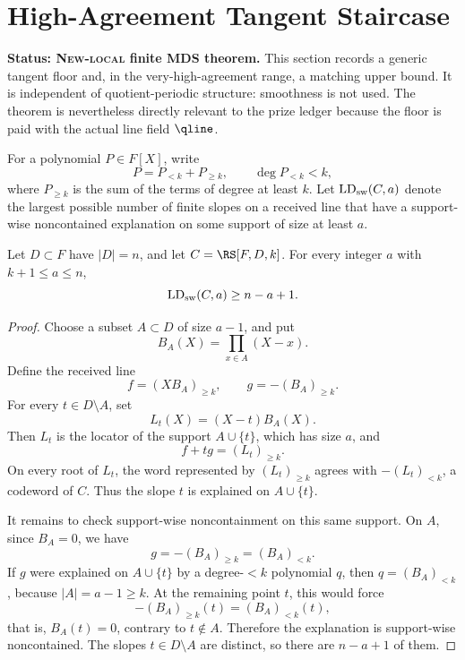 \section{High-Agreement Tangent Staircase}
\label{sec:tangent-staircase}

\textbf{Status: \textsc{New-local} finite MDS theorem.}
This section records a generic tangent floor and, in the very-high-agreement
range, a matching upper bound.  It is independent of quotient-periodic
structure: smoothness is not used.  The theorem is nevertheless directly
relevant to the prize ledger because the floor is paid with the actual line
field \(\qline\).

For a polynomial \(P\in F[X]\), write
\[
  P=P_{<k}+P_{\ge k},
  \qquad \deg P_{<k}<k,
\]
where \(P_{\ge k}\) is the sum of the terms of degree at least \(k\).  Let
\(\operatorname{LD}_{\rm sw}(C,a)\) denote the largest possible number of finite
slopes on a received line that have a support-wise noncontained explanation on
some support of size at least \(a\).

\begin{theorem}
\label{thm:moving-root-tangent-floor}
Let \(D\subset F\) have \(|D|=n\), and let
\(C=\RS[F,D,k]\).  For every integer \(a\) with \(k+1\le a\le n\),
\[
  \operatorname{LD}_{\rm sw}(C,a)\ge n-a+1 .
\]
\end{theorem}

\begin{proof}
Choose a subset \(A\subset D\) of size \(a-1\), and put
\[
  B_A(X)=\prod_{x\in A}(X-x).
\]
Define the received line
\[
  f=(XB_A)_{\ge k},
  \qquad
  g=-(B_A)_{\ge k}.
\]
For every \(t\in D\setminus A\), set
\[
  L_t(X)=(X-t)B_A(X).
\]
Then \(L_t\) is the locator of the support \(A\cup\{t\}\), which has size
\(a\), and
\[
  f+t g=(L_t)_{\ge k}.
\]
On every root of \(L_t\), the word represented by \((L_t)_{\ge k}\) agrees with
\(- (L_t)_{<k}\), a codeword of \(C\).  Thus the slope \(t\) is explained on
\(A\cup\{t\}\).

It remains to check support-wise noncontainment on this same support.  On
\(A\), since \(B_A=0\), we have
\[
  g=-(B_A)_{\ge k}=(B_A)_{<k}.
\]
If \(g\) were explained on \(A\cup\{t\}\) by a degree-\(<k\) polynomial \(q\),
then \(q=(B_A)_{<k}\), because \(|A|=a-1\ge k\).  At the remaining point \(t\),
this would force
\[
  -(B_A)_{\ge k}(t)=(B_A)_{<k}(t),
\]
that is, \(B_A(t)=0\), contrary to \(t\notin A\).  Therefore the explanation is
support-wise noncontained.  The slopes \(t\in D\setminus A\) are distinct, so
there are \(n-a+1\) of them.
\end{proof}

